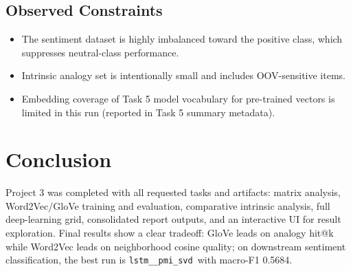 \documentclass[11pt]{article}
\newcommand{\bestExp}{\texttt{lstm\_\_pmi\_svd}}
\newcommand{\bestMacro}{0.5684}
\begin{document}
\subsection{Observed Constraints}
\begin{itemize}
    \item The sentiment dataset is highly imbalanced toward the positive class, which suppresses neutral-class performance.
    \item Intrinsic analogy set is intentionally small and includes OOV-sensitive items.
    \item Embedding coverage of Task 5 model vocabulary for pre-trained vectors is limited in this run (reported in Task 5 summary metadata).
\end{itemize}

\section{Conclusion}
Project 3 was completed with all requested tasks and artifacts:
matrix analysis, Word2Vec/GloVe training and evaluation, comparative intrinsic analysis, full deep-learning grid, consolidated report outputs, and an interactive UI for result exploration. Final results show a clear tradeoff: GloVe leads on analogy hit@k while Word2Vec leads on neighborhood cosine quality; on downstream sentiment classification, the best run is \bestExp\ with macro-F1 \bestMacro.
\end{document}
